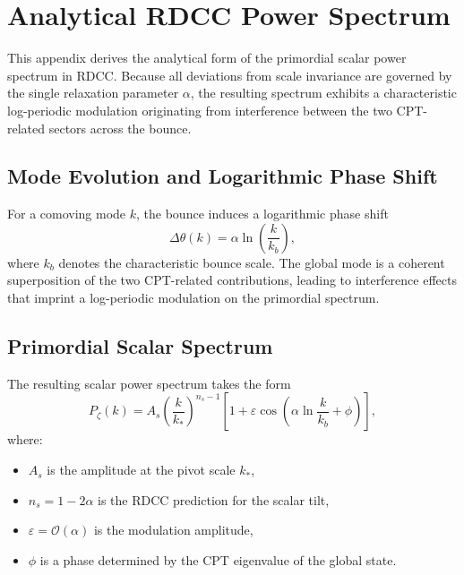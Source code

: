 \documentclass[11pt,a4paper]{article}
\begin{document}
\clearpage

\section{Analytical RDCC Power Spectrum}
\label{app:power_spectrum}

This appendix derives the analytical form of the primordial scalar power spectrum
in RDCC. Because all deviations from scale invariance are governed by the single
relaxation parameter $\alpha$, the resulting spectrum exhibits a characteristic
log-periodic modulation originating from interference between the two
CPT-related sectors across the bounce.

\subsection{Mode Evolution and Logarithmic Phase Shift}

For a comoving mode $k$, the bounce induces a logarithmic phase shift
\begin{equation}
    \Delta\theta(k)
    = \alpha \ln\!\left(\frac{k}{k_b}\right),
\end{equation}
where $k_b$ denotes the characteristic bounce scale. The global mode is a
coherent superposition of the two CPT-related contributions, leading to
interference effects that imprint a log-periodic modulation on the primordial
spectrum.

\subsection{Primordial Scalar Spectrum}

The resulting scalar power spectrum takes the form
\begin{equation}
    P_\zeta(k)
    = A_s \left(\frac{k}{k_*}\right)^{n_s - 1}
      \left[
          1 + \varepsilon
          \cos\!\left(
              \alpha \ln\frac{k}{k_b} + \phi
          \right)
      \right],
    \label{eq:RDCC_Pk_appendix}
\end{equation}
where:
\begin{itemize}
    \item $A_s$ is the amplitude at the pivot scale $k_*$,
    \item $n_s = 1 - 2\alpha$ is the RDCC prediction for the scalar tilt,
    \item $\varepsilon = \mathcal{O}(\alpha)$ is the modulation amplitude,
    \item $\phi$ is a phase determined by the CPT eigenvalue of the global state.
\end{itemize}
\end{document}
